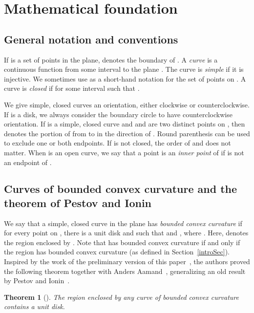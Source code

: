 \documentclass{article}
\newtheorem{theorem}{Theorem}[section]
\begin{document}
\section{Mathematical foundation}\label{mathFound}

\subsection{General notation and conventions}

If  is a set of points in the plane,  denotes the boundary of .
A \emph{curve}  is a continuous function from some interval  to the plane .
The curve  is \emph{simple} if it is injective.
We sometimes use  as a short-hand notation for the set of points  on .
A curve  is \emph{closed} if  for some interval  such that
.

We give simple, closed curves an orientation, either clockwise or counterclockwise.
If  is a disk, we always consider the boundary circle  to have counterclockwise orientation.
If  is a simple, closed curve and  and  are two distinct points on , then  denotes the portion of  from  to  in the direction of .
Round parenthesis can be used to exclude one or both endpoints.
If  is not closed, the order of  and  does not matter.
When  is an open curve, we say that a point  is an \emph{inner point} of  if  is not an endpoint of .


\subsection{Curves of bounded convex curvature and the theorem of Pestov and Ionin}

We say that a simple, closed curve  in the plane has \emph{bounded convex curvature} if for every point  on , there is a unit disk  and  such that  and , where .
Here,  denotes the region enclosed by .
Note that  has bounded convex curvature if and only if the region  has bounded convex curvature (as defined in Section~\ref{introSec}).
Inspired by the work of the preliminary version of this paper~\cite{abrahamsen_et_al:LIPIcs:2016:5896}, the authors proved the following theorem together with Anders Aamand~\cite{aam2019disks}, generalizing an old result by Pestov and Ionin~\cite{pestov1959largest}.

\begin{theorem}[\cite{aam2019disks}]\label{MAINTHM}
The region enclosed by any curve of bounded convex curvature contains a unit disk.
\end{theorem}
\end{document}
